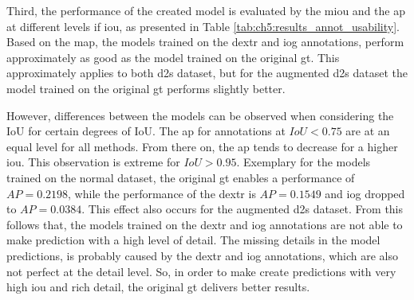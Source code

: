 Third, the performance of the created model is evaluated by the \gls{miou} and the \gls{ap} at different levels if \gls{iou}, as presented in Table \ref{tab:ch5:results_annot_usability}.
Based on the \gls{map}, the models trained on the \gls{dextr} and \gls{iog} annotations, perform approximately as good as the model trained on the original \gls{gt}.
This approximately applies to both \gls{d2s} dataset, but for the augmented \gls{d2s} dataset the model trained on the original \gls{gt} performs slightly better.

However, differences between the models can be observed when considering the IoU for certain degrees of IoU.
The \gls{ap} for annotations at $ IoU < 0.75 $ are at an equal level for all methods.
From there on, the \gls{ap} tends to decrease for a higher \gls{iou}.
This observation is extreme for $ IoU > 0.95 $. 
Exemplary for the models trained on the normal dataset, the original \gls{gt} enables a performance of $ AP = 0.2198 $, while the performance of the \gls{dextr} is $ AP = 0.1549 $ and \gls{iog} dropped to $ AP = 0.0384 $.
This effect also occurs for the augmented \gls{d2s} dataset.
From this follows that, the models trained on the \gls{dextr} and \gls{iog} annotations are not able to make prediction with a high level of detail.
The missing details in the model predictions, is probably caused by the \gls{dextr} and \gls{iog} annotations, which are also not perfect at the detail level.
So, in order to make create predictions with very high \gls{iou} and rich detail, the original \gls{gt} delivers better results.

